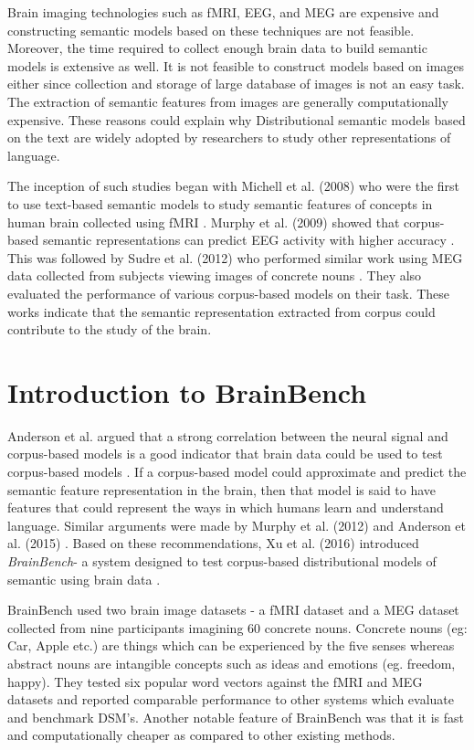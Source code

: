 Brain imaging technologies such as fMRI, EEG, and MEG are expensive and constructing semantic models based on these techniques are not feasible. Moreover, the time required to collect enough brain data to build semantic models is extensive as well. It is not feasible to construct models based on images either since collection and storage of large database of images is not an easy task. The extraction of semantic features from images are generally computationally expensive. These reasons could explain why Distributional semantic models based on the text are widely adopted by researchers to study other representations of language.

The inception of such studies began with Michell et al. (2008) who were the first to use text-based semantic models to study semantic features of concepts in human brain collected using fMRI \cite{Mitchell1191}. Murphy et al. (2009) showed that corpus-based semantic representations can predict EEG activity with higher accuracy \cite{MurphyEEG}. This was followed by Sudre et al. (2012) who performed similar work using MEG data collected from subjects viewing images of concrete nouns \cite{SUDRE2012451}.  They also evaluated the performance of various corpus-based models on their task. These works indicate that the semantic representation extracted from corpus could contribute to the study of the brain. 

\section{Introduction to BrainBench}
Anderson et al. argued that a strong correlation between the neural signal and corpus-based models \cite{Mitchell1191, MurphyEEG, SUDRE2012451}  is a good indicator that brain data could be used to test corpus-based models \cite{andersonBrainEyes}. If a corpus-based model could approximate and predict the semantic feature representation in the brain, then that model is said to have features that could represent the ways in which humans learn and understand language. Similar arguments were made by Murphy et al. (2012) \cite{Murphy2012} and Anderson et al. (2015) \cite{Anderson2015}. Based on these recommendations, Xu et al. (2016) introduced \textit{BrainBench}- a system designed to test corpus-based distributional models of semantic using brain data \cite{BrainBench2016}. 

BrainBench used two brain image datasets - a fMRI dataset \cite{Mitchell1191} and a MEG dataset \cite{SUDRE2012451} collected from nine participants imagining 60 concrete nouns. Concrete nouns (eg: Car, Apple etc.) are things which can be experienced by the five senses whereas abstract nouns are intangible concepts such as ideas and emotions (eg. freedom, happy). They tested six popular word vectors against the fMRI and MEG datasets and reported comparable performance to other systems which evaluate and benchmark DSM's. Another notable feature of BrainBench was that it is fast and computationally cheaper as compared to other existing methods. 

